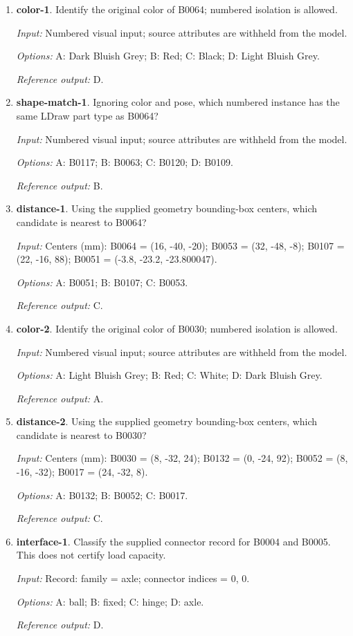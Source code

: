 \begin{enumerate}
\item \textbf{color-1}. Identify the original color of B0064; numbered isolation is allowed.\par {\small \textit{Input:} Numbered visual input; source attributes are withheld from the model. \par\textit{Options:} A: Dark Bluish Grey; B: Red; C: Black; D: Light Bluish Grey. \par\textit{Reference output:} D.}
\item \textbf{shape-match-1}. Ignoring color and pose, which numbered instance has the same LDraw part type as B0064?\par {\small \textit{Input:} Numbered visual input; source attributes are withheld from the model. \par\textit{Options:} A: B0117; B: B0063; C: B0120; D: B0109. \par\textit{Reference output:} B.}
\item \textbf{distance-1}. Using the supplied geometry bounding-box centers, which candidate is nearest to B0064?\par {\small \textit{Input:} Centers (mm): B0064 = (16, -40, -20); B0053 = (32, -48, -8); B0107 = (22, -16, 88); B0051 = (-3.8, -23.2, -23.800047). \par\textit{Options:} A: B0051; B: B0107; C: B0053. \par\textit{Reference output:} C.}
\item \textbf{color-2}. Identify the original color of B0030; numbered isolation is allowed.\par {\small \textit{Input:} Numbered visual input; source attributes are withheld from the model. \par\textit{Options:} A: Light Bluish Grey; B: Red; C: White; D: Dark Bluish Grey. \par\textit{Reference output:} A.}
\item \textbf{distance-2}. Using the supplied geometry bounding-box centers, which candidate is nearest to B0030?\par {\small \textit{Input:} Centers (mm): B0030 = (8, -32, 24); B0132 = (0, -24, 92); B0052 = (8, -16, -32); B0017 = (24, -32, 8). \par\textit{Options:} A: B0132; B: B0052; C: B0017. \par\textit{Reference output:} C.}
\item \textbf{interface-1}. Classify the supplied connector record for B0004 and B0005. This does not certify load capacity.\par {\small \textit{Input:} Record: family = axle; connector indices = 0, 0. \par\textit{Options:} A: ball; B: fixed; C: hinge; D: axle. \par\textit{Reference output:} D.}

\end{enumerate}
